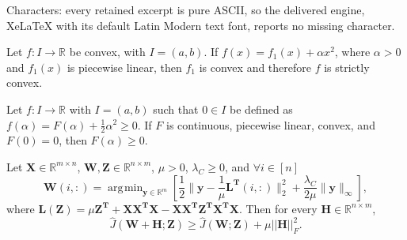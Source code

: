 \documentclass[10pt,a4paper]{amsart}
\DeclareMathOperator*{\argmin}{\arg\!\min}
\begin{document}
Characters: every retained excerpt is pure ASCII, so the delivered engine, XeLaTeX with its default Latin Modern text font, reports no missing character.
\begin{lemma}
\label{lemma:conv}
Let $f:I \rightarrow \mathbb{R}$ be convex, with $I=(a,b)$. If  $f(x) = f_1(x) + \alpha x^2$, where $\alpha > 0$ and $f_1(x)$ is piecewise linear, then $f_1$ is convex and therefore $f$ is strictly convex.
\end{lemma}

\begin{lemma}
\label{lem:F_greater_0}
    Let $f:I \rightarrow \mathbb{R}$ with $I=(a,b)$ such that $0 \in I$ be defined as $f(\alpha) = F(\alpha) + \frac{1}{2}\alpha^2 \geq 0$.  If $F$ is continuous, piecewise linear, convex, and $F(0)=0$, then $F(\alpha) \geq 0$.
\end{lemma}

\begin{lemma}
\label{lem:min}
Let $\mathbf{X} \in \mathbb{R}^{m \times n}$, $\mathbf{W}, \mathbf{Z} \in  \mathbb{R}^{n \times m}$, $\mu > 0$, $\lambda_C \geq 0$, and $\forall i \in [n]$
\[
\mathbf{W}(i,:) = \argmin_{\mathbf{y} \in \mathbb{R}^{m}} 
\left[ \frac{1}{2} \|\mathbf{y} - \frac{1}{\mu}\mathbf{L^T}(i,:) \|^2_2 + \frac{\lambda_C}{2\mu}\|\mathbf{y}\|_{\infty} \right],
\]
where $\mathbf{L(Z)} = \mu \mathbf{Z^T} + \mathbf{XX^TX} - \mathbf{XX^TZ^TX^TX}$.
Then for every $\mathbf{H} \in  \mathbb{R}^{n \times m}$,
\[
\widehat{J}(\mathbf{W+H};\mathbf{Z}) \geq \widehat{J}(\mathbf{W};\mathbf{Z}) + \mu||\mathbf{H}||_F^2.
\]
\end{lemma}
\end{document}
